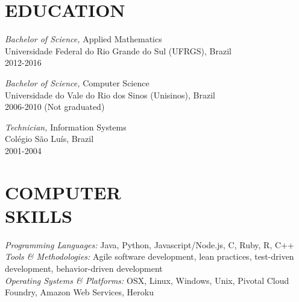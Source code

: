 \documentclass[line,margin]{res}
\begin{document}
\address{Porto Alegre, Rio Grande do Sul, Brazil}
\address{+55 51 8216 1084, fmagalhaes@gmail.com}
\address{GitHub: https://github.com/fabiogm}

\begin{resume}
 
\section{EDUCATION} {\sl Bachelor of Science,} Applied Mathematics \\
                Universidade Federal do Rio Grande do Sul (UFRGS), Brazil \\ 
                2012-2016

                   {\sl Bachelor of Science,} Computer Science \\
                Universidade do Vale do Rio dos Sinos (Unisinos), Brazil \\
                2006-2010 (Not graduated)

                   {\sl Technician,} Information Systems \\
                Colégio São Luís, Brazil \\
                2001-2004

 
\section{COMPUTER \\ SKILLS} {\sl Programming Languages:} Java, Python, Javascript/Node.js, C, Ruby, R, C++ \\
		{\sl Tools \& Methodologies:} Agile software development, lean practices, test-driven development, behavior-driven development\\
                {\sl Operating Systems \& Platforms:} OSX, Linux, Windows, Unix, Pivotal Cloud Foundry, Amazon Web Services, Heroku
 

\end{resume}
\end{document}
